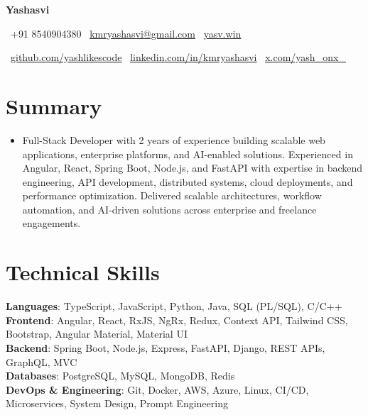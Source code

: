 \documentclass[letterpaper,11pt]{article}
\newcommand{\resumeItem}[1]{\item\small{{#1 \vspace{-2pt}}}}
\newcommand{\resumeSubHeadingListStart}{\begin{itemize}[leftmargin=0.0in, label={}]}
\newcommand{\resumeSubHeadingListEnd}{\end{itemize}}
\begin{document}
\begin{center}
    {\Huge\bfseries Yashasvi} \\ \vspace{4pt}

    \small
    \faPhone\ +91 8540904380
    \hspace{1.2em}
    \faEnvelope\ 
    \href{mailto:kmryashasvi@gmail.com}{\underline{kmryashasvi@gmail.com}}
    \hspace{1.2em}
    \faGlobe\ 
    \href{https://yasv.win}{\underline{yasv.win}}

    \vspace{4pt}

    \small
    \faGithub\ 
    \href{https://github.com/yashlikescode}{\underline{github.com/yashlikescode}}
    \hspace{1.5em}
    \faLinkedin\ 
    \href{https://linkedin.com/in/kmryashasvi}{\underline{linkedin.com/in/kmryashasvi}}
    \hspace{1.5em}
    \faTwitter\ 
    \href{https://x.com/yash_onx_}{\underline{x.com/yash\_onx\_}}

    \vspace{-8pt}
\end{center}

\section{Summary}
\resumeSubHeadingListStart
\resumeItem{Full-Stack Developer with 2 years of experience building scalable web applications, enterprise platforms, and AI-enabled solutions. Experienced in Angular, React, Spring Boot, Node.js, and FastAPI with expertise in backend engineering, API development, distributed systems, cloud deployments, and performance optimization. Delivered scalable architectures, workflow automation, and AI-driven solutions across enterprise and freelance engagements.}
\resumeSubHeadingListEnd
\vspace{-15pt}

\section{Technical Skills}
\begin{itemize}[leftmargin=0.15in, label={}]
\small{\item{
\textbf{Languages}{: TypeScript, JavaScript, Python, Java, SQL (PL/SQL), C/C++} \\
\textbf{Frontend}{: Angular, React, RxJS, NgRx, Redux, Context API, Tailwind CSS, Bootstrap, Angular Material, Material UI} \\
\textbf{Backend}{: Spring Boot, Node.js, Express, FastAPI, Django, REST APIs, GraphQL, MVC} \\
\textbf{Databases}{: PostgreSQL, MySQL, MongoDB, Redis} \\
\textbf{DevOps \& Engineering}{: Git, Docker, AWS, Azure, Linux, CI/CD, Microservices, System Design, Prompt Engineering} 
}}
\end{itemize}
\vspace{-16pt}
\end{document}

